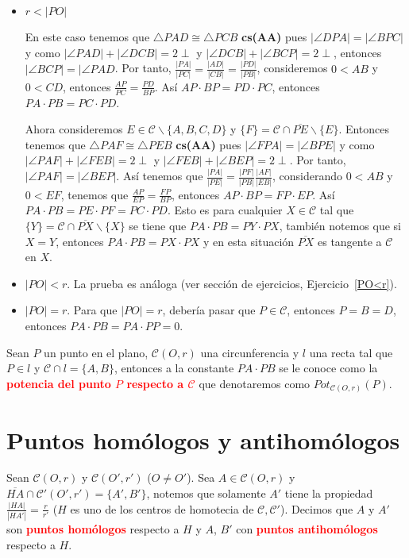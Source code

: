 \begin{itemize}
\item $r<|PO|$

En este caso tenemos que $\triangle PAD\cong\triangle PCB$ \textbf{cs(AA)} pues $|\angle DPA|=|\angle BPC|$ y como $|\angle PAD|+|\angle DCB|=2\perp$ y $|\angle DCB|+|\angle BCP|=2\perp$, entonces $|\angle BCP|=|\angle PAD$. Por tanto, $\frac{|PA|}{|PC|}=\frac{|AD|}{|CB|}=\frac{|PD|}{|PB|}$, consideremos $0<AB$ y $0<CD$, entonces $\frac{AP}{PC}=\frac{PD}{BP}$. Así $AP\cdot BP=PD\cdot PC$, entonces $PA\cdot PB=PC\cdot PD$. 

Ahora consideremos $E\in\mathcal{C}\backslash\{A,B,C,D\}$ y $\{F\}=\mathcal{C}\cap\overline{PE}\backslash\{E\}$. 
Entonces tenemos que $\triangle PAF\cong\triangle PEB$ \textbf{cs(AA)} pues $|\angle FPA|=|\angle BPE|$ y como $|\angle PAF|+|\angle FEB|=2\perp$ y $|\angle FEB|+|\angle BEP|=2\perp$. Por tanto, $|\angle PAF|=|\angle BEP|$. Así tenemos que $\frac{|PA|}{|PE|}=\frac{|PF|}{|PB|}\frac{|AF|}{|EB|}$, considerando $0<AB$ y $0<EF$, tenemos que $\frac{AP}{EP}=\frac{FP}{BP}$, entonces $AP\cdot BP=FP\cdot EP$.
Así $PA\cdot PB=PE\cdot PF=PC\cdot PD$. 
Esto es para cualquier $X\in\mathcal{C}$ tal que $\{Y\}=\mathcal{C}\cap\overline{PX}\backslash\{X\}$ se tiene que $PA\cdot PB=PY\cdot PX$, también notemos que si $X=Y$, entonces $PA\cdot PB=PX\cdot PX$ y en esta situación $\overline{PX}$ es tangente a $\mathcal{C}$ en $X$.
\item $|PO|<r$. \label{POC2} La prueba es análoga (ver sección de ejercicios, Ejercicio~\ref{PO<r}).
\item $|PO|=r$. 
Para que $|PO|=r$, debería pasar que $P\in\mathcal{C}$, entonces $P=B=D$, entonces $PA\cdot PB=PA\cdot PP=0$. 
\end{itemize}
\begin{df}
Sean $P$ un punto en el plano, $\mathcal{C}(O,r)$ una circunferencia y $l$ una recta tal que $P\in l$ y $\mathcal{C}\cap l=\{A,B\}$, entonces a la constante $PA\cdot PB$ se le conoce como la \textcolor{red}{\bf potencia del punto $P$ respecto a $\mathcal{C}$} que denotaremos como $Pot_{\mathcal{C}(O,r)}(P)$.
\end{df}
\section{Puntos homólogos y antihomólogos}
\begin{df}
Sean $\mathcal{C}(O,r)$ y $\mathcal{C}(O',r')$ ($O\neq O'$). Sea $A\in\mathcal{C}(O,r)$ y $\overline{HA}\cap\mathcal{C'}(O',r')=\{A',B'\}$, notemos que solamente $A'$ tiene la propiedad $\frac{|HA|}{|HA'|}=\frac{r}{r'}$ ($H$ es uno de los centros de homotecia de $\mathcal{C}, \mathcal{C'}$). Decimos que $A$ y $A'$ son \textcolor{red}{\bf puntos homólogos} respecto a $H$ y $A$, $B'$ con \textcolor{red}{\bf puntos antihomólogos} respecto a $H$.
\end{df}

